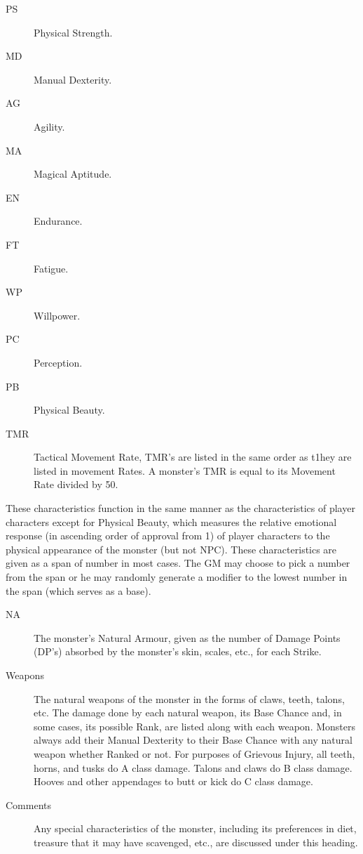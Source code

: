 \begin{multicols}{3}
\begin{description}
\item[PS] Physical Strength.
\item[MD] Manual Dexterity.
\item[AG] Agility.
\item[MA] Magical Aptitude.
\item[EN] Endurance.
\item[FT] Fatigue.
\item[WP] Willpower.
\item[PC] Perception.
\item[PB] Physical Beauty.
\item[TMR] Tactical Movement Rate, TMR's are listed in the same order
as t1hey are listed in movement Rates.  A monster's TMR is equal to
its Movement Rate divided by 50.
\end{description}
These characteristics function in the same manner as the
characteristics of player characters except for Physical Beauty, which
measures the relative emotional response (in ascending order of
approval from 1) of player characters to the physical appearance of
the monster (but not NPC).  These characteristics are given as a span
of number in most cases.  The GM may choose to pick a number from the
span or he may randomly generate a modifier to the lowest number in
the span (which serves as a base).

\begin{description}
\item[NA] The monster's Natural Armour, given as the number of Damage
Points (DP's) absorbed by the monster's skin, scales, etc., for each
Strike.

\item[Weapons] The natural weapons of the monster in the forms of
claws, teeth, talons, etc.  The damage done by each natural weapon,
its Base Chance and, in some cases, its possible Rank, are listed
along with each weapon.  Monsters always add their Manual Dexterity to
their Base Chance with any natural weapon whether Ranked or not.  For
purposes of Grievous Injury, all teeth, horns, and tusks do A class
damage.  Talons and claws do B class damage.  Hooves and other
appendages to butt or kick do C class damage.

\item[Comments] Any special characteristics of the monster, including
its preferences in diet, treasure that it may have scavenged, etc.,
are discussed under this heading.

\end{description}
\end{multicols}
